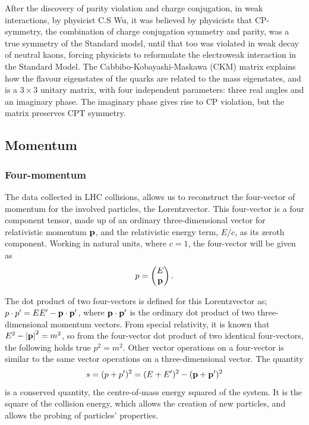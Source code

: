 \documentclass[12pt,a4paper]{article}
\numberwithin{equation}{section}
\begin{document}
After the discovery of parity violation and charge conjugation, in weak
interactions, by physicist C.S Wu\cite{PhysRev.105.1413}, it was believed by
physicists that CP-symmetry, the combination of charge conjugation symmetry and
parity, was a true symmetry of the Standard model, until that too was violated
in weak decay of neutral kaons, forcing physicists to reformulate the
electroweak interaction in the Standard Model. The Cabbibo-Kobayashi-Maskawa
(CKM) matrix explains how the flavour eigenstates of the quarks are related to
the mass eigenstates, and is a $3 \times 3$ unitary matrix, with four independent
parameters: three real angles and an imaginary phase\cite[153]{Povh2015}. The
imaginary phase gives rise to CP violation, but the matrix preserves CPT
symmetry.

\subsection{Momentum}\label{sec:momentum}

\subsubsection{Four-momentum}
The data collected in LHC collisions, allows us to reconstruct the four-vector
of momentum for the involved particles, the Lorentzvector. This four-vector is a
four component tensor, made up of an ordinary three-dimensional vector for
relativistic momentum $\vb p$, and the relativistic energy term, $E/c$, as its
zeroth component. Working in natural units, where $c=1$, the four-vector will be
given as
\begin{equation}
p = \left(\begin{matrix} E \\ \vb p \end{matrix} \right).
\end{equation}

The dot product of two four-vectors is defined for this Lorentzvector as;
$p\cdot p' = E E' - \vb p \cdot \vb{p'}$, where $\vb p \cdot \vb{p'}$ is the ordinary dot
product of two three-dimensional momentum vectors. From special relativity, it is known
that $E^2 - \abs{\vb p}^2 = m^2$, so from the four-vector dot product of two
identical four-vectors, the following holds true $p^2 = m^2$. Other vector
operations on a four-vector is similar to the same vector operations on a
three-dimensional vector. The quantity
\begin{equation}
s = (p + p')^2 = (E + E')^2 - (\vb p + \vb p')^2
\end{equation}
is a conserved quantity, the centre-of-mass energy squared of the system. It is
the square of the collision energy, which allows the creation of new particles,
and allows the probing of particles' properties.
\end{document}
